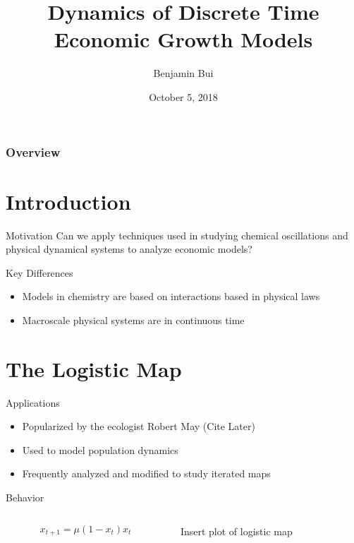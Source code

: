 \documentclass{beamer}
\title{Dynamics of Discrete Time Economic Growth Models}
\author{Benjamin Bui}
\date{October 5, 2018}
\begin{document}
\begin{frame}
	\titlepage
\end{frame}

\begin{frame}
	\frametitle{Overview}
	\tableofcontents
\end{frame}

\section{Introduction}
\begin{frame}{Motivation}
	Can we apply techniques used in studying chemical oscillations and physical dynamical systems to analyze economic models?
\end{frame}

\begin{frame}{Key Differences}
	\begin{itemize}
		\item
			Models in chemistry are based on interactions based in physical laws
		\pause
		\item
			Macroscale physical systems are in continuous time
	\end{itemize}
\end{frame}

\section{The Logistic Map}

\begin{frame}{Applications}
	\begin{itemize}
		\item
		 	Popularized by the ecologist Robert May (Cite Later)
		\item
			Used to model population dynamics
		\item
			Frequently analyzed and modified to study iterated maps
	\end{itemize}
\end{frame}

\begin{frame}{Behavior}
	\begin{columns}
		\begin{column}{0.5\textwidth}
			\begin{equation*}
				x_{t+1}=\mu(1-x_t)x_t
			\end{equation*}
		\end{column}
		\begin{column}{0.5\textwidth}
			Insert plot of logistic map
		\end{column}
	\end{columns}
\end{frame}
\end{document}

